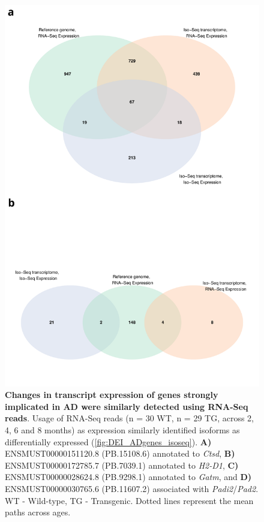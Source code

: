 \begin{figure}[!htp]
	\centering
	\includegraphics[page=19,scale = 0.55]{Figures/WholeDifferentialAnalysis.pdf}
	\captionsetup{width=0.95\textwidth}
	\caption[Changes in transcript expression of genes strongly implicated in AD were similarly detected using RNA-Seq reads]%
	{\textbf{Changes in transcript expression of genes strongly implicated in AD were similarly detected using RNA-Seq reads}. Usage of RNA-Seq reads (n = 30 WT, n = 29 TG, across 2, 4, 6 and 8 months) as expression similarly identified isoforms as differentially expressed (\cref{fig:DEI_ADgenes_isoseq}). \textbf{A)} ENSMUST00000151120.8 (PB.15108.6) annotated to \textit{Ctsd}, \textbf{B)} ENSMUST00000172785.7 (PB.7039.1) annotated to \textit{H2-D1}, \textbf{C)} ENSMUST00000028624.8 (PB.9298.1) annotated to \textit{Gatm}, and \textbf{D)} ENSMUST00000030765.6 (PB.11607.2) associated with \textit{Padi2}/\textit{Pad2}.  WT - Wild-type, TG - Transgenic. Dotted lines represent the mean paths across ages.}   
	\label{fig:DEI_ADgenes_rnaseq}
\end{figure}

